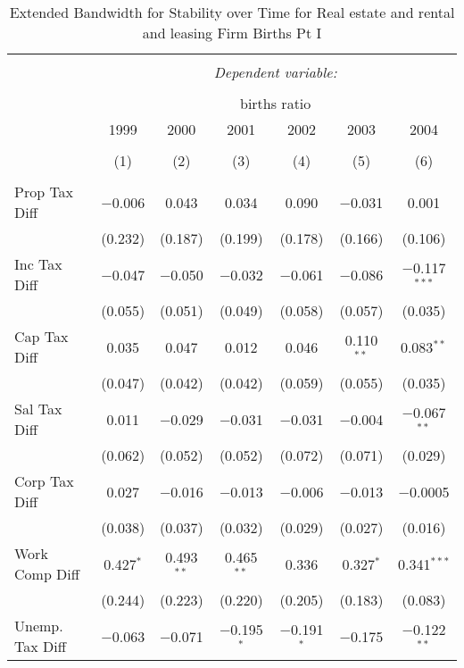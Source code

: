 
\begin{table}[!htbp] \centering 
  \caption{Extended Bandwidth for Stability over Time for  Real estate and rental and leasing Firm Births Pt I} 
  \label{53year_eb} 
\small 
\begin{tabular}{@{\extracolsep{5pt}}lcccccc} 
\\[-1.8ex]\hline 
\hline \\[-1.8ex] 
 & \multicolumn{6}{c}{\textit{Dependent variable:}} \\ 
\cline{2-7} 
\\[-1.8ex] & \multicolumn{6}{c}{births ratio} \\ 
 & 1999 & 2000 & 2001 & 2002 & 2003 & 2004 \\ 
\\[-1.8ex] & (1) & (2) & (3) & (4) & (5) & (6)\\ 
\hline \\[-1.8ex] 
 Prop Tax Diff & $-$0.006 & 0.043 & 0.034 & 0.090 & $-$0.031 & 0.001 \\ 
  & (0.232) & (0.187) & (0.199) & (0.178) & (0.166) & (0.106) \\ 
  Inc Tax Diff & $-$0.047 & $-$0.050 & $-$0.032 & $-$0.061 & $-$0.086 & $-$0.117$^{***}$ \\ 
  & (0.055) & (0.051) & (0.049) & (0.058) & (0.057) & (0.035) \\ 
  Cap Tax Diff & 0.035 & 0.047 & 0.012 & 0.046 & 0.110$^{**}$ & 0.083$^{**}$ \\ 
  & (0.047) & (0.042) & (0.042) & (0.059) & (0.055) & (0.035) \\ 
  Sal Tax Diff & 0.011 & $-$0.029 & $-$0.031 & $-$0.031 & $-$0.004 & $-$0.067$^{**}$ \\ 
  & (0.062) & (0.052) & (0.052) & (0.072) & (0.071) & (0.029) \\ 
  Corp Tax Diff & 0.027 & $-$0.016 & $-$0.013 & $-$0.006 & $-$0.013 & $-$0.0005 \\ 
  & (0.038) & (0.037) & (0.032) & (0.029) & (0.027) & (0.016) \\ 
  Work Comp Diff & 0.427$^{*}$ & 0.493$^{**}$ & 0.465$^{**}$ & 0.336 & 0.327$^{*}$ & 0.341$^{***}$ \\ 
  & (0.244) & (0.223) & (0.220) & (0.205) & (0.183) & (0.083) \\ 
  Unemp. Tax Diff & $-$0.063 & $-$0.071 & $-$0.195$^{*}$ & $-$0.191$^{*}$ & $-$0.175 & $-$0.122$^{**}$ \\ 

\end{tabular}
\end{table}
